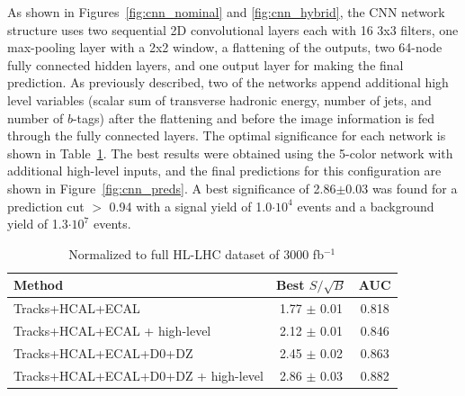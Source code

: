 As shown in Figures~\ref{fig:cnn_nominal} and \ref{fig:cnn_hybrid}, the CNN network structure uses two sequential 2D convolutional layers each with 16 3x3 filters, one max-pooling layer with a 2x2 window, a flattening of the outputs, two 64-node fully connected hidden layers, and one output layer for making the final prediction. As previously described, two of the networks append additional high level variables (scalar sum of transverse hadronic energy, number of jets, and number of $b$-tags) after the flattening and before the image information is fed through the fully connected layers. The optimal significance for each network is shown in Table~\ref{tab:cnnResults}. The best results were obtained using the 5-color network with additional high-level inputs, and the final predictions for this configuration are shown in Figure~\ref{fig:cnn_preds}. A best significance of 2.86$\pm$0.03 was found for a prediction cut $>$ 0.94 with a signal yield of 1.0$\cdot 10^4$ events and a background yield of 1.3$\cdot 10^7$ events.

\begin{table}[h!]
\label{tab:cnnResults}
  \begin{center}
    \begin{tabular}{|l|c|c|} %
      \hline\hline
      \textbf{Method} & Best $S/\sqrt{B}$ & AUC \\
      \hline
      Tracks+HCAL+ECAL & 1.77 $\pm$ 0.01 & 0.818 \\
      Tracks+HCAL+ECAL + high-level & 2.12 $\pm$ 0.01 & 0.846 \\
      Tracks+HCAL+ECAL+D0+DZ & 2.45 $\pm$ 0.02 & 0.863 \\
      Tracks+HCAL+ECAL+D0+DZ + high-level & 2.86 $\pm$ 0.03 & 0.882 \\

      \hline\hline
    \end{tabular}
    \caption{Normalized to full HL-LHC dataset of 3000 fb$^{-1}$}
  \end{center}
\end{table}


